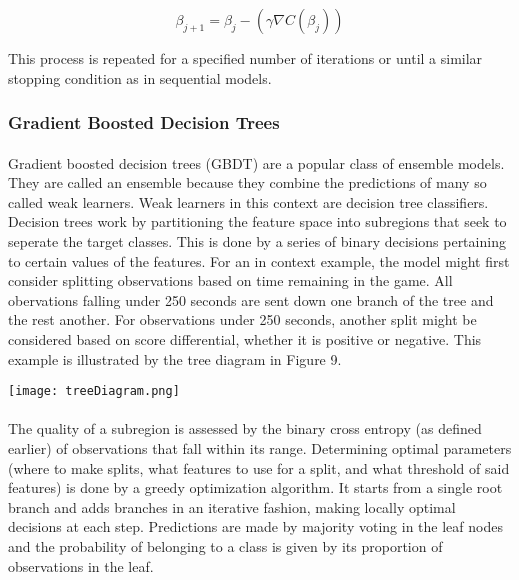 \documentclass[11pt]{article}
\newenvironment{Figure}
  {\par\medskip\noindent\minipage{\linewidth}}
  {\endminipage\par\medskip}
\begin{document}
\begin{multicols*}{2}
                    $$\beta_{j+1} = \beta_j - (\gamma \nabla C(\beta_j))$$

                    This process is repeated for a specified number of iterations or until a similar stopping condition as in sequential models. 

            \subsubsection*{Gradient Boosted Decision Trees}
                \paragraph{}
                    Gradient boosted decision trees (GBDT) are a popular class of ensemble models. 
                    They are called an ensemble because they combine the predictions of many so called weak learners. 
                    Weak learners in this context are decision tree classifiers. 
                    Decision trees work by partitioning the feature space into subregions that seek to seperate the target classes.
                    This is done by a series of binary decisions pertaining to certain values of the features. 
                    For an in context example, the model might first consider splitting observations based on time remaining in the game. 
                    All obervations falling under 250 seconds are sent down one branch of the tree and the rest another. 
                    For observations under 250 seconds, another split might be considered based on score differential, whether it is positive or negative.
                    This example is illustrated by the tree diagram in Figure 9.
                    
                    \begin{Figure}  
                        \centering
                        \texttt{[image: treeDiagram.png]}
                        \label{fig:Simple Tree}
                    \end{Figure}

                    
                \paragraph{}
                    The quality of a subregion is assessed by the binary cross entropy (as defined earlier) of observations that fall within its range. 
                    Determining optimal parameters (where to make splits, what features to use for a split, and what threshold of said features) is done by a greedy optimization algorithm.
                    It starts from a single root branch and adds branches in an iterative fashion, making locally optimal decisions at each step. 
                    Predictions are made by majority voting in the leaf nodes and the probability of belonging to a class is given by its proportion of observations in the leaf. 
                    

\end{multicols*}
\end{document}
